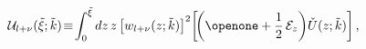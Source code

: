 \begin{equation}
{\mathcal U}_{l+\nu} ( \tilde{\xi};  \tilde{k}  ) 
\!
 \equiv 
\!
\int_{0}^{  \tilde{\xi}  } 
d z \, z
 \left[ w_{l+\nu} (z;  \tilde{k} ) \right]^{2} 
\!
\left[
\!
\left(
\openone
+
\frac{1}{2}
\,
{\mathcal E}_{z}
 \right)
\!
\check{U} (z; \tilde{k})
\right]
,
\label{eq:mathcal_U_integral_def}
\end{equation}

